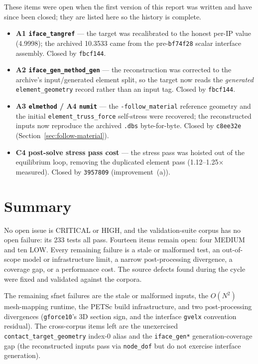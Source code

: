 \documentclass[11pt,a4paper]{report}
\newcommand{\code}[1]{\texttt{#1}}
\begin{document}
These items were open when the first version of this report was written and
have since been closed; they are listed here so the history is complete.

\begin{itemize}
  \item \textbf{A1 \code{iface\_\allowbreak tangref}} --- the target was recalibrated to the
        honest per-IP value (4.9998); the archived 10.3533 came from the
        pre-\code{bf74f28} scalar interface assembly. Closed by \code{fbcf144}.
  \item \textbf{A2 \code{iface\_\allowbreak gen\_\allowbreak method\_\allowbreak gen}} --- the reconstruction was
        corrected to the archive's input/generated element split, so the target
        now reads the \emph{generated} \code{element\_\allowbreak geometry} record rather than
        an input tag. Closed by \code{fbcf144}.
  \item \textbf{A3 \code{elmethod} / A4 \code{numit}} --- the \code{-follow\_\allowbreak material}
        reference geometry and the initial \code{element\_\allowbreak truss\_\allowbreak force}
        self-stress were recovered; the reconstructed inputs now reproduce the
        archived \code{.dbs} byte-for-byte. Closed by \code{c8ee32e}
        (Section~\ref{sec:follow-material}).
  \item \textbf{C4 post-solve stress pass cost} --- the stress pass was hoisted
        out of the equilibrium loop, removing the duplicated element pass
        (1.12--1.25$\times$ measured). Closed by \code{3957809}
        (improvement~(a)).
\end{itemize}

\section{Summary}

No open issue is CRITICAL or HIGH, and the validation-suite corpus has no open
failure: its 233 tests all pass. Fourteen items remain open: four MEDIUM and ten
LOW. Every remaining failure is a stale or malformed test, an out-of-scope model
or infrastructure limit, a narrow post-processing divergence, a coverage gap, or
a performance cost. The source defects found during the cycle were fixed and
validated against the corpora.

The remaining sfnet failures are the stale or malformed inputs, the $O(N^2)$
mesh-mapping runtime, the PETSc build infrastructure, and two post-processing
divergences (\code{gforce10}'s 3D section sign, and the interface \code{gvelx}
convention residual). The cross-corpus items left are the unexercised
\code{contact\_\allowbreak target\_\allowbreak geometry} index-0 alias and the
\code{iface\_\allowbreak gen*} generation-coverage gap (the reconstructed inputs
pass via \code{node\_\allowbreak dof} but do not exercise interface generation).
\end{document}
